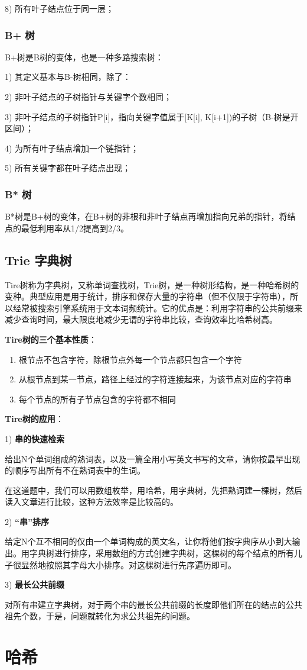 \documentclass[UTF8,a4paper,12pt]{ctexbook}
\begin{document}
				8) 所有叶子结点位于同一层；
			
			\subsection{B+ 树}
				B+树是B树的变体，也是一种多路搜索树：
				
				1) 其定义基本与B-树相同，除了：
				
				2) 非叶子结点的子树指针与关键字个数相同；
				
				3) 非叶子结点的子树指针P[i]，指向关键字值属于[K[i], K[i+1])的子树（B-树是开区间）；
				
				4) 为所有叶子结点增加一个链指针；
				
				5) 所有关键字都在叶子结点出现；
				
			\subsection{B* 树}
				B*树是B+树的变体，在B+树的非根和非叶子结点再增加指向兄弟的指针，将结点的最低利用率从1/2提高到2/3。
			
		\section{Trie 字典树}	
			Tire树称为字典树，又称单词查找树，Trie树，是一种树形结构，是一种哈希树的变种。典型应用是用于统计，排序和保存大量的字符串（但不仅限于字符串），所以经常被搜索引擎系统用于文本词频统计。它的优点是：利用字符串的公共前缀来减少查询时间，最大限度地减少无谓的字符串比较，查询效率比哈希树高。　
			
			\textbf{Tire树的三个基本性质}：
				\begin{enumerate}[itemindent = 1em]
					\item 根节点不包含字符，除根节点外每一个节点都只包含一个字符
					\item 从根节点到某一节点，路径上经过的字符连接起来，为该节点对应的字符串
					\item 每个节点的所有子节点包含的字符都不相同
				\end{enumerate}

			\textbf{Tire树的应用}：

			1) \textbf{串的快速检索}
			
			给出N个单词组成的熟词表，以及一篇全用小写英文书写的文章，请你按最早出现的顺序写出所有不在熟词表中的生词。
			
			在这道题中，我们可以用数组枚举，用哈希，用字典树，先把熟词建一棵树，然后读入文章进行比较，这种方法效率是比较高的。
			
			2) \textbf{“串”排序}
			
			给定N个互不相同的仅由一个单词构成的英文名，让你将他们按字典序从小到大输出。用字典树进行排序，采用数组的方式创建字典树，这棵树的每个结点的所有儿子很显然地按照其字母大小排序。对这棵树进行先序遍历即可。
			
			3) \textbf{最长公共前缀}
			
			对所有串建立字典树，对于两个串的最长公共前缀的长度即他们所在的结点的公共祖先个数，于是，问题就转化为求公共祖先的问题。


\chapter{哈希}


  
		    
\end{document}
